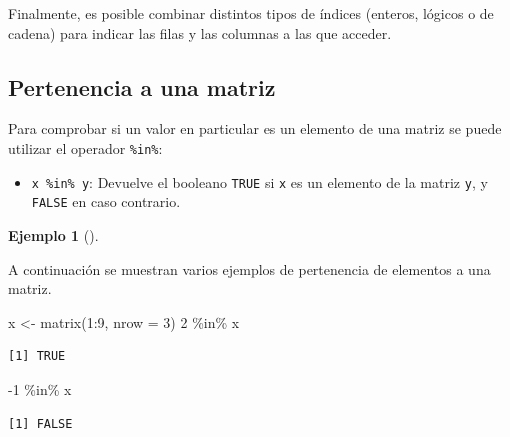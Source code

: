 \documentclass[
  a4paper,
]{scrreport}
\newenvironment{Shaded}{\begin{snugshade}}{\end{snugshade}}
\newcommand{\AttributeTok}[1]{\textcolor[rgb]{0.40,0.45,0.13}{#1}}
\newcommand{\DecValTok}[1]{\textcolor[rgb]{0.68,0.00,0.00}{#1}}
\newcommand{\FunctionTok}[1]{\textcolor[rgb]{0.28,0.35,0.67}{#1}}
\newcommand{\NormalTok}[1]{\textcolor[rgb]{0.00,0.23,0.31}{#1}}
\newcommand{\OtherTok}[1]{\textcolor[rgb]{0.00,0.23,0.31}{#1}}
\newcommand{\SpecialCharTok}[1]{\textcolor[rgb]{0.37,0.37,0.37}{#1}}
\providecommand{\tightlist}{%
  \setlength{\itemsep}{0pt}\setlength{\parskip}{0pt}}\usepackage{longtable,booktabs,array}
\theoremstyle{definition}
\theoremstyle{definition}
\newtheorem{example}{Ejemplo}[chapter]
\theoremstyle{remark}
\begin{document}
Finalmente, es posible combinar distintos tipos de índices (enteros,
lógicos o de cadena) para indicar las filas y las columnas a las que
acceder.

\hypertarget{pertenencia-a-una-matriz}{%
\subsection{Pertenencia a una matriz}\label{pertenencia-a-una-matriz}}

Para comprobar si un valor en particular es un elemento de una matriz se
puede utilizar el operador \texttt{\%in\%}:

\begin{itemize}
\tightlist
\item
  \texttt{x\ \%in\%\ y}: Devuelve el booleano \texttt{TRUE} si
  \texttt{x} es un elemento de la matriz \texttt{y}, y \texttt{FALSE} en
  caso contrario.
\end{itemize}

\leavevmode{}%
\begin{example}[]\label{exm-pertenencia-matriz}

A continuación se muestran varios ejemplos de pertenencia de elementos a
una matriz.

\begin{Shaded}
\begin{Highlighting}[]
\NormalTok{x }\OtherTok{\textless{}{-}} \FunctionTok{matrix}\NormalTok{(}\DecValTok{1}\SpecialCharTok{:}\DecValTok{9}\NormalTok{, }\AttributeTok{nrow =} \DecValTok{3}\NormalTok{)}
\DecValTok{2} \SpecialCharTok{\%in\%}\NormalTok{ x}
\end{Highlighting}
\end{Shaded}

\begin{verbatim}
[1] TRUE
\end{verbatim}

\begin{Shaded}
\begin{Highlighting}[]
\SpecialCharTok{{-}}\DecValTok{1} \SpecialCharTok{\%in\%}\NormalTok{ x}
\end{Highlighting}
\end{Shaded}

\begin{verbatim}
[1] FALSE
\end{verbatim}

\end{example}
\end{document}
